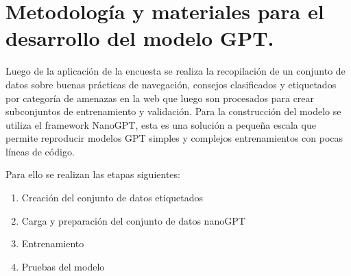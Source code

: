 \section{Metodología y materiales para el desarrollo del modelo GPT.}\label{section:Metodología y materiales para el desarrollo del modelo GPT} 
Luego de la aplicación de la encuesta se realiza la recopilación de un conjunto de datos sobre buenas prácticas de navegación, consejos clasificados y etiquetados por categoría de amenazas en la web que luego son procesados para crear subconjuntos de entrenamiento y validación.
Para la construcción del modelo se utiliza el framework NanoGPT, esta es una solución a pequeña escala que permite reproducir modelos GPT simples y complejos entrenamientos con pocas líneas de código. \cite{Yang2020}

Para ello se realizan las etapas siguientes:
 \begin{enumerate}
        \item Creación del conjunto de datos etiquetados
        \item Carga y preparación del conjunto de datos nanoGPT
        \item Entrenamiento
        \item Pruebas del modelo
    \end{enumerate}

